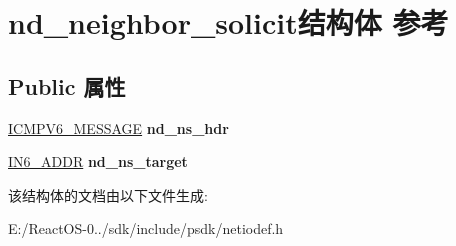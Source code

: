 \hypertarget{structnd__neighbor__solicit}{}\section{nd\+\_\+neighbor\+\_\+solicit结构体 参考}
\label{structnd__neighbor__solicit}
\subsection*{Public 属性}
\begin{DoxyCompactItemize}
\item 
\mbox{\label{structnd__neighbor__solicit_a3db86f13b1f9c295eb30b440020093c3}} 
\hyperlink{struct___i_c_m_p___m_e_s_s_a_g_e}{I\+C\+M\+P\+V6\+\_\+\+M\+E\+S\+S\+A\+GE} {\bfseries nd\+\_\+ns\+\_\+hdr}
\item 
\mbox{\label{structnd__neighbor__solicit_ad49b39b1476ea76bdf5fa8befce3be0f}} 
\hyperlink{structin6__addr}{I\+N6\+\_\+\+A\+D\+DR} {\bfseries nd\+\_\+ns\+\_\+target}
\end{DoxyCompactItemize}


该结构体的文档由以下文件生成\+:\begin{DoxyCompactItemize}
\item 
E\+:/\+React\+O\+S-\/0../sdk/include/psdk/netiodef.\+h\end{DoxyCompactItemize}
